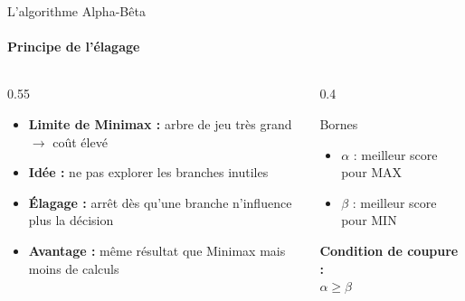 \documentclass[10pt, aspectratio=169]{beamer}
\begin{document}
\begin{frame}{L'algorithme Alpha-Bêta}
    \framesubtitle{Principe de l'élagage}

    \begin{columns}[T]
        \begin{column}{0.55\textwidth}
            \vspace{0.3cm}
            \begin{itemize}
                \item \textbf{Limite de Minimax :} arbre de jeu très grand $\rightarrow$ coût élevé
                \vspace{0.3cm}
                \item \textbf{Idée :} ne pas explorer les branches inutiles
                \vspace{0.3cm}
                \item \textbf{Élagage :} arrêt dès qu'une branche n'influence plus la décision
                \vspace{0.3cm}
                \item \textbf{Avantage :} même résultat que Minimax mais moins de calculs
            \end{itemize}
        \end{column}
        
        \begin{column}{0.4\textwidth}
            \begin{block}{Bornes}
                \begin{itemize}
                    \item $\alpha$ : meilleur score pour MAX 
                    \vspace{0.2cm}
                    \item $\beta$ : meilleur score pour MIN
                \end{itemize}
            \end{block}
            \vspace{0.3cm}
            \centering
            \textbf{Condition de coupure :}\\
            \textcolor{DarkPink}{$\alpha \geq \beta$}
        \end{column}
    \end{columns}
\end{frame}
\end{document}
